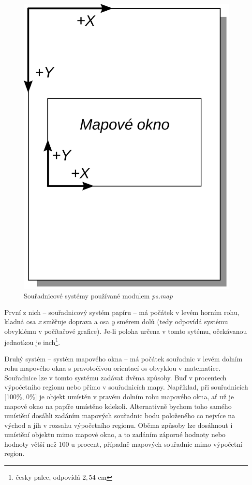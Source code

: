 \documentclass[a4paper,12pt,draft]{article}
\newcommand{\modul}[1]{\emph{#1}}
\begin{document}
\begin{figure}[h!]
    \centering
    \includegraphics[width=0.2\textheight]{sour_systemy.pdf}
    \caption{Souřadnicové systémy používané modulem \modul{ps.map}\label{fig:sour_systemy}}
\end{figure}


První z nich -- souřadnicový systém papíru -- má počátek v levém horním rohu, kladná osa \emph{x} směřuje doprava a osa \emph{y} směrem dolů (tedy odpovídá systému obvyklému v počítačové grafice). 
Je-li poloha určena v tomto sytému, očekávanou jednotkou je inch\footnote{ česky palec, odpovídá $2{},54$ cm}.

Druhý systém -- systém mapového okna -- má počátek souřadnic v levém dolním rohu mapového okna s pravotočivou orientací os obvyklou v matematice. Souřadnice lze v tomto systému zadávat dvěma způsoby. Buď v procentech výpočetního regionu nebo přímo v souřadnicích mapy. Například, při souřadnicích [100\%, 0\%] je objekt umístěn v pravém dolním rohu mapového okna, ať už je mapové okno na papíře umístěno kdekoli. Alternativně bychom toho samého umístění dosáhli zadáním mapových souřadnic bodu položeného co nejvíce na východ a jih v rozsahu výpočetního regionu. Oběma způsoby lze dosáhnout i umístění objektu mimo mapové okno, a to zadáním záporné hodnoty nebo hodnoty větší než 100 u procent, případně mapových souřadnic mimo výpočetní region.
\end{document}
